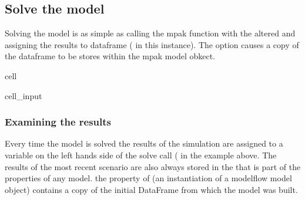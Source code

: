 \documentclass[letterpaper,10pt,english]{jupyterBook}
\begin{document}
\subsection{Solve the model}
\label{\detokenize{content/05_WBModels/MoreComplexScenarios:solve-the-model}}
\sphinxAtStartPar
Solving the model is as simple as calling the mpak function with the altered  and assigning the results to dataframe ( in this instance).  The  option causes a copy of the dataframe to be stores within the mpak model obkect.

\begin{sphinxuseclass}{cell}\begin{sphinxVerbatimInput}

\begin{sphinxuseclass}{cell_input}
\begin{sphinxVerbatim}[commandchars=\\\{\}]
   
\end{sphinxVerbatim}

\end{sphinxuseclass}\end{sphinxVerbatimInput}

\end{sphinxuseclass}

\subsubsection{Examining the results}
\label{\detokenize{content/05_WBModels/MoreComplexScenarios:examining-the-results}}
\sphinxAtStartPar
Every time the model is solved the results of the simulation are assigned to a variable on the left hands side of the solve call ( in the example above.  The results of the most recent scenario are also always stored in the   that is part of the properties of any  model. the  property of  (an instantiation of a modelflow model object) contains a copy of the initial DataFrame from which the model was built.
\end{document}
